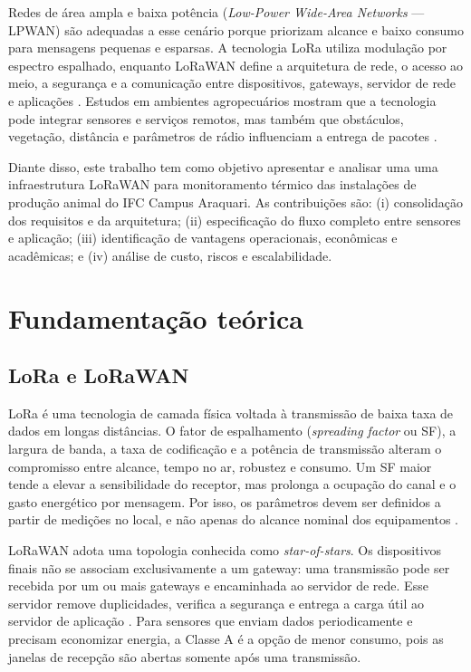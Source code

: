 \documentclass[10pt,a4paper,twocolumn]{article}
\begin{document}
Redes de área ampla e baixa potência (\textit{Low-Power Wide-Area Networks} ---
LPWAN) são adequadas a esse cenário porque priorizam alcance e baixo consumo para
mensagens pequenas e esparsas. A tecnologia LoRa utiliza modulação por espectro
espalhado, enquanto LoRaWAN define a arquitetura de rede, o acesso ao meio, a
segurança e a comunicação entre dispositivos, gateways, servidor de rede e
aplicações \cite{macedo2023}. Estudos em ambientes agropecuários mostram que a
tecnologia pode integrar sensores e serviços remotos, mas também que obstáculos,
vegetação, distância e parâmetros de rádio influenciam a entrega de pacotes
\cite{fu2022,ting2024,ahmed2025}.

Diante disso, este trabalho tem como objetivo apresentar e analisar uma
uma infraestrutura LoRaWAN para monitoramento térmico das instalações de produção
animal do IFC Campus Araquari. As contribuições são: (i) consolidação dos
requisitos e da arquitetura; (ii) especificação do fluxo completo entre sensores
e aplicação; (iii) identificação de vantagens operacionais, econômicas e
acadêmicas; e (iv) análise de custo, riscos e escalabilidade.

\section{Fundamentação teórica}

\subsection{LoRa e LoRaWAN}

LoRa é uma tecnologia de camada física voltada à transmissão de baixa taxa de
dados em longas distâncias. O fator de espalhamento (\textit{spreading factor} ou
SF), a largura de banda, a taxa de codificação e a potência de transmissão
alteram o compromisso entre alcance, tempo no ar, robustez e consumo. Um SF maior
tende a elevar a sensibilidade do receptor, mas prolonga a ocupação do canal e o
gasto energético por mensagem. Por isso, os parâmetros devem ser definidos a
partir de medições no local, e não apenas do alcance nominal dos equipamentos
\cite{macedo2023,krizanovic2023}.

LoRaWAN adota uma topologia conhecida como \textit{star-of-stars}. Os
dispositivos finais não se associam exclusivamente a um gateway: uma transmissão
pode ser recebida por um ou mais gateways e encaminhada ao servidor de rede. Esse
servidor remove duplicidades, verifica a segurança e entrega a carga útil ao
servidor de aplicação \cite{macedo2023}. Para sensores que enviam dados
periodicamente e precisam economizar energia, a Classe A é a opção de menor
consumo, pois as janelas de recepção são abertas somente após uma transmissão.
\end{document}
